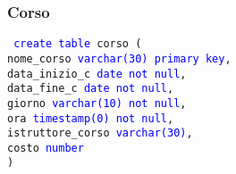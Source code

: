 \documentclass{article}
\begin{document}
    \subsubsection{Corso}
    \begin{flushleft}
        \texttt{
        \textcolor{blue}{create table} corso ( \\
        \hspace*{2em} nome\_corso \hspace*{4.8em} \textcolor{blue}{varchar(30)} \hspace*{4em} \textcolor{blue}{primary key}, \\
        \hspace*{2em} data\_inizio\_c \hspace*{3.5em} \textcolor{blue}{date} \hspace*{7.5em} \textcolor{blue}{not null}, \\
        \hspace*{2em} data\_fine\_c \hspace*{4.5em} \textcolor{blue}{date} \hspace*{7.5em} \textcolor{blue}{not null}, \\
        \hspace*{2em} giorno \hspace*{6.7em} \textcolor{blue}{varchar(10)}  \hspace*{4.1em} \textcolor{blue}{not null}, \\
        \hspace*{2em} ora \hspace*{8.2em} \textcolor{blue}{timestamp(0)}  \hspace*{3.7em} \textcolor{blue}{not null}, \\
        \hspace*{2em} istruttore\_corso \hspace*{1.9em} \textcolor{blue}{varchar(30)}, \\
        \hspace*{2em} costo \hspace*{7.4em} \textcolor{blue}{number} \\)}
    \end{flushleft}
\end{document}
